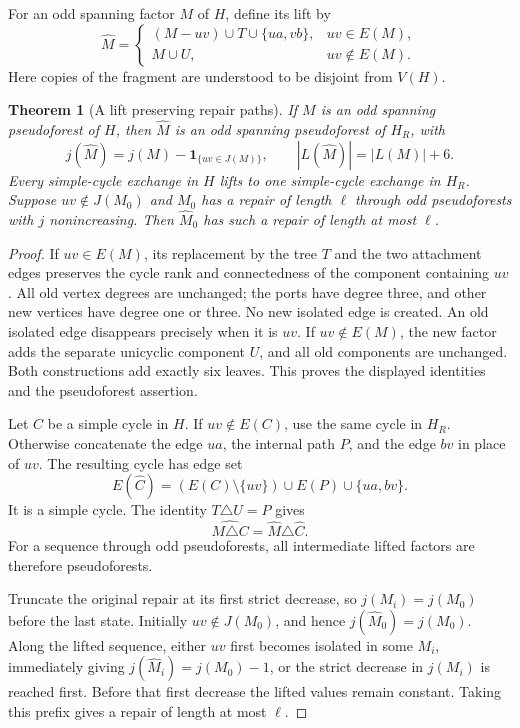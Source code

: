 \documentclass[11pt]{article}
\newtheorem{theorem}{Theorem}[section]
\begin{document}
For an odd spanning factor $M$ of $H$, define its lift by
\[
 \widehat M=\begin{cases}
 (M-uv)\cup T\cup\{ua,vb\},&uv\in E(M),\\
 M\cup U,&uv\notin E(M).
 \end{cases}
\]
Here copies of the fragment are understood to be disjoint from
$V(H)$.

\begin{theorem}[A lift preserving repair paths]\label{thm:repair-lift}
If $M$ is an odd spanning pseudoforest of $H$, then $\widehat M$
is an odd spanning pseudoforest of $H_R$, with
\[
 j(\widehat M)=j(M)-\mathbf1_{\{uv\in J(M)\}},\qquad
 |L(\widehat M)|=|L(M)|+6.
\]
Every simple-cycle exchange in $H$ lifts to one simple-cycle
exchange in $H_R$. Suppose $uv\notin J(M_0)$ and $M_0$ has a
repair of length $\ell$ through odd pseudoforests with $j$
nonincreasing. Then $\widehat M_0$ has such a repair of length
at most $\ell$.
\end{theorem}
\begin{proof}
If $uv\in E(M)$, its replacement by the tree $T$ and the two
attachment edges preserves the cycle rank and connectedness of
the component containing $uv$. All old vertex degrees are
unchanged; the ports have degree three, and other new vertices
have degree one or three. No new isolated edge is created.
An old isolated edge disappears precisely when it is $uv$.
If $uv\notin E(M)$, the new factor adds the separate unicyclic
component $U$, and all old components are unchanged. Both
constructions add exactly six leaves. This proves the displayed
identities and the pseudoforest assertion.

Let $C$ be a simple cycle in $H$. If $uv\notin E(C)$, use the
same cycle in $H_R$. Otherwise concatenate the edge $ua$, the
internal path $P$, and the edge $bv$ in place of $uv$. The
resulting cycle has edge set
\[
 E(\widehat C)=(E(C)\setminus\{uv\})\cup E(P)\cup\{ua,bv\}.
\]
It is a simple cycle. The identity $T\triangle U=P$ gives
\[
 \widehat{M\triangle C}=\widehat M\triangle\widehat C.
\]
For a sequence through odd pseudoforests, all intermediate lifted
factors are therefore pseudoforests.

Truncate the original repair at its first strict decrease, so
$j(M_i)=j(M_0)$ before the last state. Initially $uv\notin J(M_0)$,
and hence $j(\widehat M_0)=j(M_0)$. Along the lifted sequence,
either $uv$ first becomes isolated in some $M_i$, immediately
giving $j(\widehat M_i)=j(M_0)-1$, or the strict decrease in
$j(M_i)$ is reached first. Before that first decrease the lifted
values remain constant. Taking this prefix gives a repair of
length at most $\ell$.
\end{proof}
\end{document}
